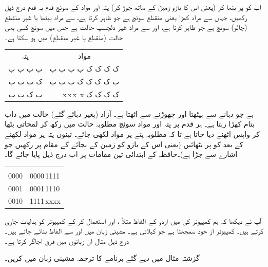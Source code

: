 اب  کو   پر بٹھا کر     (یعنی اس کا بازو  زمین کے ساتھ جوڑ کر) پتہ  اور مواد کے  سوئچ    قدم بہ قدم   درج ذیل رکھیں، جہاں  سے مراد  کھڑا   یعنی منقطع  سوئچ ہے جو  ظاہر کرتا ہے،   سے مراد بیٹھا یا غیر منقطع (چالو) سوئچ ہے  جو     ظاہر کرتا ہے، اور  سے مراد  غیر دلچسپ حالت ہے  جس میں    سوئچ کسی بھی حالت (منقطع یا غیر منقطع)    میں ہو سکتا ہے۔
\begin{center}
\begin{tabular}{rr}
\multicolumn{1}{c}{پتہ}& \multicolumn{1}{c}{مواد}\\[1ex]
ب ب ب ب & ک ک ک ک   ب ب ب ب\\
ک ب ب ب & ب ک ک ک  ک ب ب ب\\
ب ک ب ب & \,\,\,\,\,
 x\,\quad  x\,\quad  x\, \quad x \quad
  ک ک ک ک
\end{tabular}
\end{center}

 ہے جو    دبانے سے بیٹھتا   اور چھوڑنے سے اٹھتا ہے۔ آزاد   (بغیر دبائے گئے)  حالت میں  داب بتام کھڑا رہتا ہے۔  ہر قدم پر  پتہ اور  مواد سوئچ  مطلوبہ حالت میں رکھ کر    لمحاتی بٹھا کر  واپس اٹھنے دیا جاتا ہے تا کہ مطلوبہ پتے پر مواد لکھی جائے۔ تینوں پتہ پر مواد لکھنے کے بعد  کو     پر بٹھائیں (یعنی  اس کے بازو کو  زمین کے بجائے  کے مقام پر رکھیں جو  اشارے سے جڑا ہے)۔حافظہ کے ابتدائی تین  مقامات پر اب درج ذیل پایا جائے گا۔
\begin{center}
\begin{tabular}{LL}
& \\[1ex]
0000&0000\,1111\\
0001&0001\,1110\\
0010&1111\,xxxx
\end{tabular}
\end{center}

آپ نے دیکھا کہ ہم کمپیوٹر کی  میں اردو  کے الفاظ مثلاً  ، اور   استعمال کر کے کمپیوٹر  کو ہدایات جاری کرتے ہیں۔ کمپیوٹر از خود  سمجھتا ہے جو       کہلاتی ہے۔  مشینی  زبان میں   اور   سے الفاظ بنائے جاتے ہیں۔ درج ذیل مثال  ان  زبانوں میں فرق اجاگر کرتا ہے۔

گزشتہ مثال میں دیے گئے  برنامے کا ترجمہ مشینی  زبان میں کریں۔


